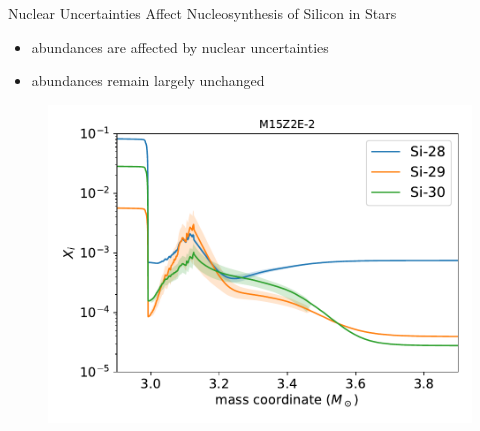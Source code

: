 \documentclass[10pt]{beamer}
\begin{document}
\begin{frame}{Nuclear Uncertainties Affect Nucleosynthesis of Silicon in Stars}
    \begin{minipage}{5cm}
        \begin{itemize}
            \setlength\itemsep{2em}
            \item {} abundances are affected by nuclear uncertainties
            \item {} abundances remain largely unchanged
        \end{itemize}
    \end{minipage}
    \begin{minipage}{6.5cm}
    \centering
        \begin{figure}
            \centering
            \includegraphics[width = \textwidth]{figs/M15Z2E-2_mcresult.pdf}
        \end{figure}
    \end{minipage}
\end{frame}

\end{document}
